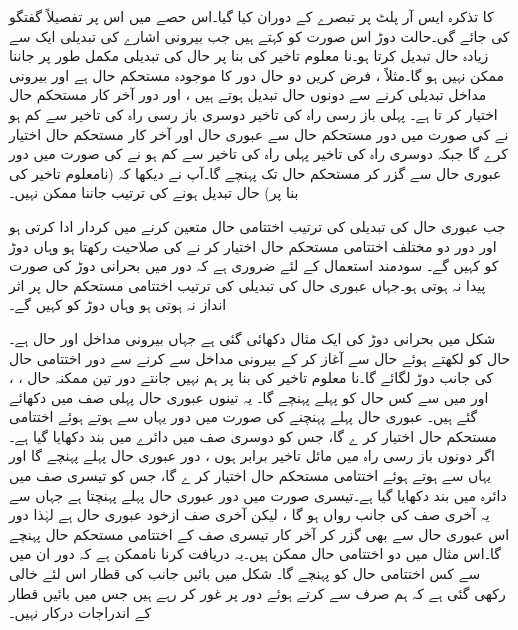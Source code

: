  کا تذکرہ  ایس آر پلٹ پر تبصرے کے  دوران کیا گیا۔اس حصے  میں اس پر تفصیلاً گفتگو  کی جائے گی۔حالت دوڑ اس صورت کو کہتے ہیں جب  بیرونی اشارے  کی تبدیلی   ایک سے زیادہ حال تبدیل  کرتا ہو۔نا معلوم تاخیر کی بنا پر حال  کی تبدیلی مکمل طور پر جاننا ممکن  نہیں ہو گا۔مثلاً ،   فرض کریں دو حال   دور کا موجودہ مستحکم حال   ہے اور  بیرونی مداخل تبدیلی  کرنے سے دونوں حال تبدیل ہوتے ہیں ، اور دور آخر کار   مستحکم حال اختیار کر تا ہے۔ پہلی باز رسی راہ کی تاخیر دوسری باز رسی راہ کی تاخیر سے کم ہو نے کی صورت میں  دور مستحکم حال   سے عبوری حال    اور آخر کار مستحکم حال  اختیار کرے گا جبکہ  دوسری راہ کی تاخیر پہلی راہ  کی تاخیر سے کم ہو نے کی صورت میں دور   عبوری حال   سے گزر کر مستحکم حال    تک پہنچے گا۔آپ نے دیکھا کہ  (نامعلوم   تاخیر  کی بنا پر)  حال تبدیل  ہونے کی ترتیب جاننا  ممکن نہیں۔

جب  عبوری حال   کی تبدیلی کی ترتیب   اختتامی حال متعین کرنے میں کردار ادا کرتی ہو اور   دور دو مختلف  اختتامی مستحکم حال اختیار کر نے کی صلاحیت رکھتا  ہو وہاں  دوڑ کو   کہیں گے۔   سودمند استعمال کے لئے ضروری ہے کہ دور میں بحرانی دوڑ   کی صورت  پیدا نہ ہوتی ہو۔جہاں عبوری حال  کی تبدیلی کی ترتیب  اختتامی مستحکم حال پر اثر انداز نہ ہوتی ہو وہاں  دوڑ کو کہیں گے۔



شکل میں بحرانی دوڑ کی ایک مثال   دکھائی گئی ہے  جہاں بیرونی مداخل   اور  حال     ہے۔  حال کو    لکھتے  ہوئے حال  سے آغاز  کر کے بیرونی مداخل   سے    کرنے سے  دور  اختتامی  حال  کی جانب دوڑ لگائے گا۔نا معلوم تاخیر کی بنا پر   ہم نہیں جانتے دور تین ممکنہ حال   ، ، اور   میں سے کس حال   کو پہلے پہنچے گا۔  یہ تینوں عبوری حال  پہلی صف میں دکھائے گئے ہیں۔  عبوری حال     پہلے پہنچنے کی صورت میں  دور   یہاں سے ہوتے ہوئے  اختتامی مستحکم حال   اختیار کر ے گا، جس کو دوسری صف میں دائرے میں بند  دکھایا  گیا ہے۔اگر دونوں باز رسی راہ میں مائل تاخیر  برابر ہوں ، دور   عبوری حال      پہلے پہنچے گا اور یہاں سے ہوتے ہوئے  اختتامی مستحکم حال   اختیار کر ے گا، جس کو تیسری صف میں دائرہ میں بند دکھایا گیا ہے۔تیسری صورت میں دور عبوری حال   پہلے   پہنچتا ہے جہاں  سے یہ آخری صف کی جانب رواں ہو گا ، لیکن آخری صف ازخود عبوری حال ہے لہٰذا  دور  اس عبوری حال سے بھی گزر کر آخر کار تیسری  صف کے اختتامی  مستحکم حال    پہنچے گا۔اس مثال میں دو  اختتامی حال ممکن ہیں۔یہ دریافت کرنا ناممکن ہے کہ دور ان میں سے کس  اختتامی حال  کو پہنچے گا۔ شکل میں بائیں  جانب  کی قطار اس لئے  خالی  رکھی گئی ہے کہ ہم صرف   سے     کرتے   ہوئے دور پر غور کر رہے ہیں جس میں بائیں قطار    کے اندراجات   درکار نہیں۔

